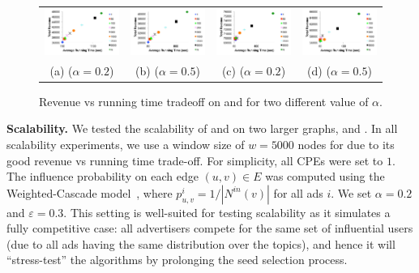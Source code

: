 \begin{figure}[t!]
\vspace{-4mm} %
\begin{tabular}{cccc}
    \includegraphics[width=.24\textwidth]{flix_rev_time_0_2}&
    \hspace{-2mm}\includegraphics[width=.24\textwidth]{flix_rev_time_0_5}&
    \includegraphics[width=.24\textwidth]{epi_rev_time_0_2}&
    \hspace{-2mm}\includegraphics[width=.24\textwidth]{epi_rev_time_0_5}\\
	(a) \flix ($\alpha=0.2$)  & (b) \flix ($\alpha=0.5$) & (c)  \epi ($\alpha=0.2$) & (d) \epi ($\alpha=0.5$)   \\
\end{tabular}
\caption{Revenue vs running time tradeoff on \flix and \epi for two different value of $\alpha$.}
\label{fig:windowTradeoff}
\end{figure}


\smallskip\noindent\textbf{Scalability.} We tested the scalability of \fastca and \fastcs on two larger graphs, \dblp and \livej. In all scalability experiments, we use a window size of $w = 5000$ nodes for \fastcs due to its good revenue vs running time trade-off. For simplicity, all CPEs were set to $1$.
The influence probability on each edge $(u,v)\in E$ was computed using the Weighted-Cascade model~\cite{kempe03}, where $p_{u,v}^i = 1/{|N^{in}(v)|}$ for all ads $i$.
We set $\alpha=0.2$ and $\varepsilon = 0.3$.
This setting is well-suited for testing scalability as it simulates a fully competitive case: all advertisers compete for the same set of influential users (due to all ads having the same distribution over the topics), and hence it will ``stress-test'' the algorithms by prolonging the seed selection process.

